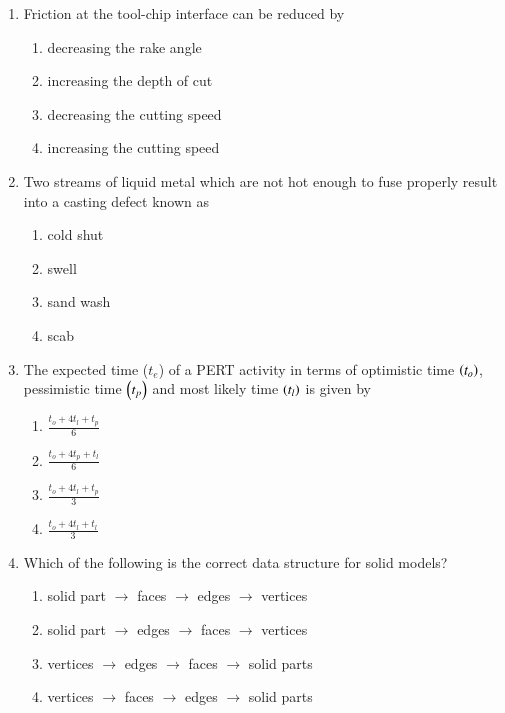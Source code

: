 \documentclass[journal]{IEEEtran}
\begin{document}
\begin{enumerate}
    \item Friction at the tool-chip interface can be reduced by
    \begin{multicols}{2}
    \begin{enumerate}
        \item decreasing the rake angle
        \item increasing the depth of cut
        \item decreasing the cutting speed
        \item increasing the cutting speed
    \end{enumerate}
    \end{multicols}

    \item Two streams of liquid metal which are not hot enough to fuse properly
    result into a casting defect known as
    \begin{multicols}{4}
    \begin{enumerate}
        \item cold shut
        \item swell
        \item sand wash
        \item scab
    \end{enumerate}
    \end{multicols}

    \item The expected time ($t_e$) of a PERT activity in terms of optimistic time
    $\left(t_o\right)$, pessimistic time $\left(t_p\right)$ and most likely time $\left(t_l\right)$
    is given by
    \begin{multicols}{2}
    \begin{enumerate}
        \item $\frac{t_o + 4t_l + t_p}{6}$
        \item $\frac{t_o + 4t_p + t_l}{6}$
        \item $\frac{t_o + 4t_l + t_p}{3}$
        \item $\frac{t_o + 4t_l + t_l}{3}$
    \end{enumerate}
    \end{multicols}

    \item Which of the following is the correct data structure for solid models?
    \begin{enumerate}
        \item solid part $\rightarrow$ faces $\rightarrow$ edges $\rightarrow$ vertices
        \item solid part $\rightarrow$ edges $\rightarrow$ faces $\rightarrow$ vertices
        \item vertices $\rightarrow$ edges $\rightarrow$ faces $\rightarrow$ solid parts
        \item vertices $\rightarrow$ faces $\rightarrow$ edges $\rightarrow$ solid parts
    \end{enumerate}


\end{enumerate}
\end{document}
